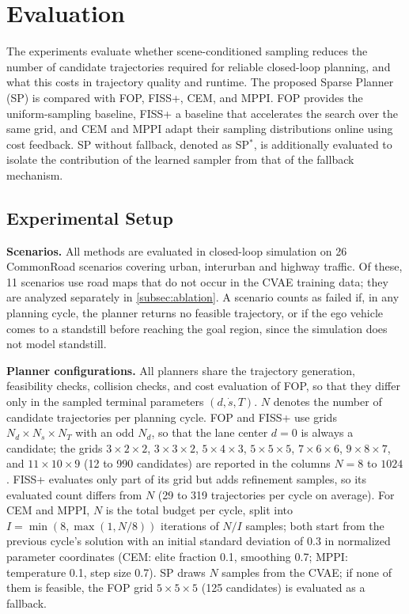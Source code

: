 \section{Evaluation}
\label{sec:evaluation}
The experiments evaluate whether scene-conditioned sampling reduces the number of candidate trajectories required for reliable closed-loop planning, and what this costs in trajectory quality and runtime.
The proposed Sparse Planner (SP) is compared with FOP, FISS+, CEM, and MPPI.
FOP provides the uniform-sampling baseline, FISS+ a baseline that accelerates the search over the same grid, and CEM and MPPI adapt their sampling distributions online using cost feedback.
SP without fallback, denoted as SP$^{*}$, is additionally evaluated to isolate the contribution of the learned sampler from that of the fallback mechanism.

\subsection{Experimental Setup}
\label{subsec:setup}
\textbf{Scenarios.}
All methods are evaluated in closed-loop simulation on 26 CommonRoad scenarios covering urban, interurban and highway traffic.
Of these, 11 scenarios use road maps that do not occur in the CVAE training data; they are analyzed separately in \autoref{subsec:ablation}.
A scenario counts as failed if, in any planning cycle, the planner returns no feasible trajectory, or if the ego vehicle comes to a standstill before reaching the goal region, since the simulation does not model standstill.

\textbf{Planner configurations.}
All planners share the trajectory generation, feasibility checks, collision checks, and cost evaluation of FOP, so that they differ only in the sampled terminal parameters $(d, \dot{s}, T)$.
$N$ denotes the number of candidate trajectories per planning cycle.
FOP and FISS+ use grids $N_d \times N_{\dot{s}} \times N_T$ with an odd $N_d$, so that the lane center $d=0$ is always a candidate; the grids $3{\times}2{\times}2$, $3{\times}3{\times}2$, $5{\times}4{\times}3$, $5{\times}5{\times}5$, $7{\times}6{\times}6$, $9{\times}8{\times}7$, and $11{\times}10{\times}9$ (12 to 990 candidates) are reported in the columns $N=8$ to $1024$.
FISS+ evaluates only part of its grid but adds refinement samples, so its evaluated count differs from $N$ (29 to 319 trajectories per cycle on average).
For CEM and MPPI, $N$ is the total budget per cycle, split into $I=\min(8,\max(1,N/8))$ iterations of $N/I$ samples; both start from the previous cycle's solution with an initial standard deviation of 0.3 in normalized parameter coordinates (CEM: elite fraction 0.1, smoothing 0.7; MPPI: temperature 0.1, step size 0.7).
SP draws $N$ samples from the CVAE; if none of them is feasible, the FOP grid $5{\times}5{\times}5$ (125 candidates) is evaluated as a fallback.

